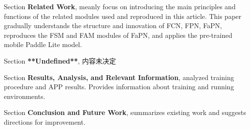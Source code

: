 Section \uppercase\expandafter{} \textbf{Related Work}, meanly focus on introducing the main principles and functions of the related modules used and reproduced in this article. This paper gradually understands the structure and innovation of FCN, FPN, FaPN, reproduces the FSM and FAM modules of FaPN, and applies the pre-trained mobile Paddle Lite model.


Section \uppercase\expandafter{} \textbf{**Undefined**}, 内容未决定


Section \uppercase\expandafter{} \textbf{Results, Analysis, and Relevant Information}, analyzed training procedure and APP results. Provides information about training and running environments.


Section \uppercase\expandafter{} \textbf{Conclusion and Future Work}, summarizes existing work and suggests directions for improvement.
\clearpage